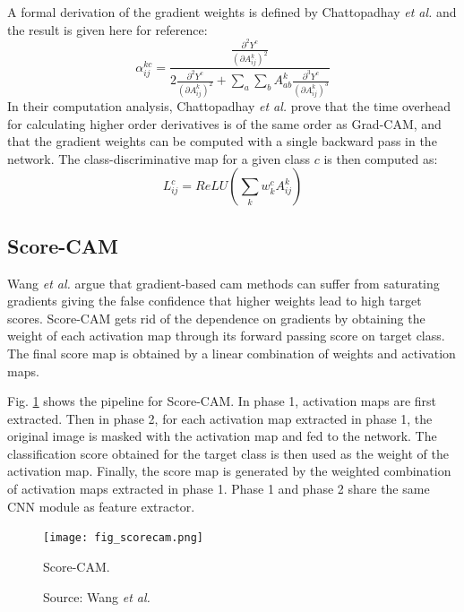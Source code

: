 A formal derivation of the gradient weights is defined by Chattopadhay \textit{et al.} \cite{chattopadhay2018grad} and the result is given here for reference:
\begin{equation}
    \alpha_{ij}^{kc} = \frac{\frac{\partial^{2}{Y^c}}{\left( \partial{A_{ij}^{k}} \right)^2}}{2\frac{\partial^{2}{Y^c}}{\left( \partial{A_{ij}^{k}} \right)^2} + \sum_a \sum_b A_{ab}^{k} {\frac{\partial^{3}{Y^c}}{\left( \partial{A_{ij}^{k}} \right)^3}} }
\end{equation}
In their computation analysis, Chattopadhay \textit{et al.} \cite{chattopadhay2018grad} prove that the time overhead for calculating higher order derivatives is of the same order as Grad-CAM, and that the gradient weights can be computed with a single backward pass in the network. The class-discriminative map for a given class $c$ is then computed as:
\begin{equation}
    L_{ij}^{c} = ReLU \left( \sum_{k}w_{k}^{c} A_{ij}^{k} \right)
\end{equation}

\subsection{Score-CAM}
Wang \textit{et al.} \cite{wang2020score} argue that gradient-based \acrshort{cam} methods can suffer from saturating gradients giving the false confidence that higher weights lead to high target scores. Score-CAM gets rid of the dependence on gradients by obtaining the weight of each activation map through its forward passing score on target class. The final score map is obtained by a linear combination of weights and activation maps.

Fig. \ref{fig:scorecam} shows the pipeline for Score-CAM. In phase 1, activation maps are first extracted. Then in phase 2, for each activation map extracted in phase 1, the original image is masked with the activation map and fed to the network. The classification score obtained for the target class is then used as the weight of the activation map. Finally, the score map is generated by the weighted combination of activation maps extracted in phase 1. Phase 1 and phase 2 share the same CNN module as feature extractor. 
\begin{figure}[h]
    \begin{center}       
    \texttt{[image: fig\_scorecam.png]}
    \caption[Score-CAM]{Score-CAM.}
    \caption*{Source: Wang \textit{et al.} \cite{wang2020score}}
    \label{fig:scorecam}
    \end{center}
\end{figure}

